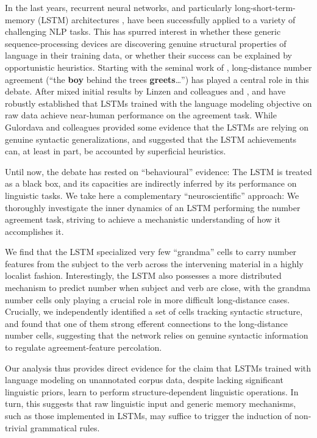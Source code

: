 In the last years, recurrent neural networks, and particularly
long-short-term-memory (LSTM) architectures
\cite{Hochreiter:Schmidhuber:1997}, have been successfully applied to
a variety of challenging NLP tasks. This has spurred interest in
whether these generic sequence-processing devices are discovering
genuine structural properties of language in their training data, or
whether their success can be explained by opportunistic
heuristics. Starting with the seminal work of , long-distance number agreement (``the
\textbf{boy} behind the trees \textbf{greets}\ldots'') has played a
central role in this debate. After mixed initial results by Linzen and
colleagues and ,
 and  have
robustly established that LSTMs trained with the language modeling
objective on raw data achieve near-human performance on the
agreement task. While Gulordava and colleagues provided some evidence that the
LSTMs are relying on genuine syntactic generalizations,
 and 
suggested that the LSTM achievements can, at least in part, be
accounted by superficial heuristics.

Until now, the debate has rested on ``behavioural'' evidence: The
LSTM is treated as a black box, and its capacities are indirectly
inferred by its performance on linguistic tasks. We take here a
complementary ``neuroscientific'' approach: We thoroughly investigate
the inner dynamics of an LSTM performing the number agreement task,
striving to achieve a mechanistic understanding of how it accomplishes
it.

We find that the LSTM specialized very few ``grandma'' cells
\cite{Bowers:2009} to carry number features from the subject to the
verb across the intervening material in a highly localist
fashion. Interestingly, the LSTM also possesses a more distributed
mechanism to predict number when subject and verb are close, with the
grandma number cells only playing a crucial role in more difficult
long-distance cases. Crucially, we independently identified a set of
cells tracking syntactic structure, and found that one of them  strong efferent connections to the long-distance number cells,
suggesting that the network relies on genuine syntactic information to
regulate agreement-feature percolation.

Our analysis thus provides direct evidence for the claim that LSTMs
trained with language modeling on unannotated corpus data, despite
lacking significant linguistic priors, learn to perform
structure-dependent linguistic operations. In turn, this suggests that
raw linguistic input and generic memory mechanisms, such as those
implemented in LSTMs, may suffice to trigger the induction of
non-trivial grammatical rules.
